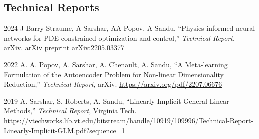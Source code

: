 \documentclass[11pt,letterpaper]{report}
\newcommand{\paperinfo}[5]{
    \tab{}
    #1, %
    \enquote{#2,} %
    \textit{#3}, %
    #4. %
    \href{#5}{#5} %
}
\begin{document}





    \subsection*{Technical Reports}

    \begin{tablist}
        \item[2024] \paperinfo{J Barry-Straume, A Sarshar, AA Popov, A Sandu}
                                {Physics-informed neural networks for PDE-constrained optimization and control}
                                {Technical Report}
                                {arXiv}
                                {arXiv preprint arXiv:2205.03377}
        \item[2022] \paperinfo{A. A. Popov, A. Sarshar, A. Chenault, A. Sandu}
                                {A Meta-learning Formulation of the Autoencoder Problem for Non-linear Dimensionality Reduction}
                                {Technical Report}
                                {arXiv}
                                {https://arxiv.org/pdf/2207.06676}

        \item[2019] \paperinfo{A. Sarshar, S. Roberts, A. Sandu}
                                {Linearly-Implicit General Linear Methods}
                                {Technical Report}
                                {Virginia Tech}
                                {https://vtechworks.lib.vt.edu/bitstream/handle/10919/109996/Technical-Report-Linearly-Implicit-GLM.pdf?sequence=1}
    \end{tablist}



\end{document}
